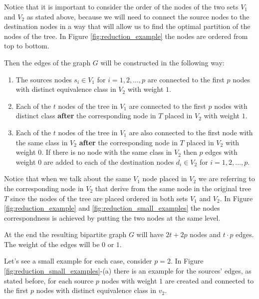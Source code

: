 Notice that it is important to consider the order of the nodes of the two sets $V_1$ and $V_2$ as stated above, because we will need to connect the source nodes to the destination nodes in a way that will allow us to find the optimal partition of the nodes of the tree. In Figure \ref{fig:reduction_example} the nodes are ordered from top to bottom.

Then the edges of the graph $G$ will be constructed in the following way:
\begin{enumerate}
    \item The sources nodes $s_i \in V_1$ for $i = 1, 2, \dots, p$ are connected to the first $p$ nodes with distinct equivalence class in $V_2$ with weight $1$.
    \item Each of the $t$ nodes of the tree in $V_1$ are connected to the first $p$ nodes with distinct class \textbf{after} the corresponding node in $T$ placed in $V_2$ with weight $1$.
    \item Each of the $t$ nodes of the tree in $V_1$ are also connected to the first node with the same class in $V_2$ \textbf{after} the corresponding node in $T$ placed in $V_2$ with weight $0$. If there is no node with the same class in $V_2$ then $p$ edges with weight $0$ are added to each of the destination nodes $d_i \in V_2$ for $i = 1, 2, \dots, p$.
\end{enumerate}

Notice that when we talk about the same $V_1$ node placed in $V_2$ we are referring to the corresponding node in $V_2$ that derive from the same node in the original tree $T$ since the nodes of the tree are placed ordered in both sets $V_1$ and $V_2$. In Figure \ref{fig:reduction_example} and \ref{fig:reduction_small_examples} the nodes correspondness is achieved by putting the two nodes at the same level.

At the end the resulting bipartite graph $G$ will have $2t + 2p$ nodes and $t \cdot p$ edges. The weight of the edges will be $0$ or $1$.

Let's see a small example for each case, consider $p=2$. In Figure \ref{fig:reduction_small_examples}-(a) there is an example for the sources' edges, as stated before, for each source $p$ nodes with weight $1$ are created and connected to the first $p$ nodes with distinct equivalence class in $v_2$.

